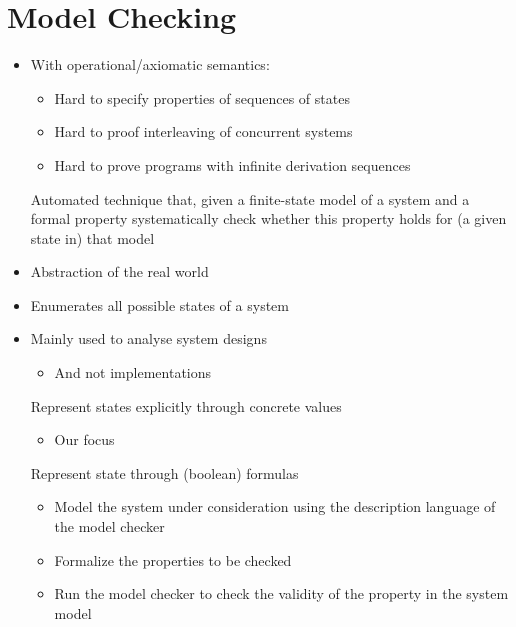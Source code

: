 
\section{Model Checking}
\begin{itemize}
    \item With operational/axiomatic semantics:
        \begin{itemize}
            \item Hard to specify properties of sequences of states
            \item Hard to proof interleaving of concurrent systems
            \item Hard to prove programs with infinite derivation sequences
        \end{itemize}
     Automated technique that, given a finite-state model of a system and a formal property systematically check whether this property holds for (a given state in) that model
    \item Abstraction of the real world
    \item Enumerates all possible states of a system
    \item Mainly used to analyse system designs
        \begin{itemize}
            \item And not implementations
        \end{itemize}
     Represent states explicitly through concrete values
        \begin{itemize}
            \item Our focus
        \end{itemize}
     Represent state through (boolean) formulas
        \begin{itemize}
                \begin{itemize}
                    \item Model the system under consideration using the description language of the model checker
                    \item Formalize the properties to be checked
                \end{itemize}
                \begin{itemize}
                    \item Run the model checker to check the validity of the property in the system model

\end{itemize}
\end{itemize}
\end{itemize}
